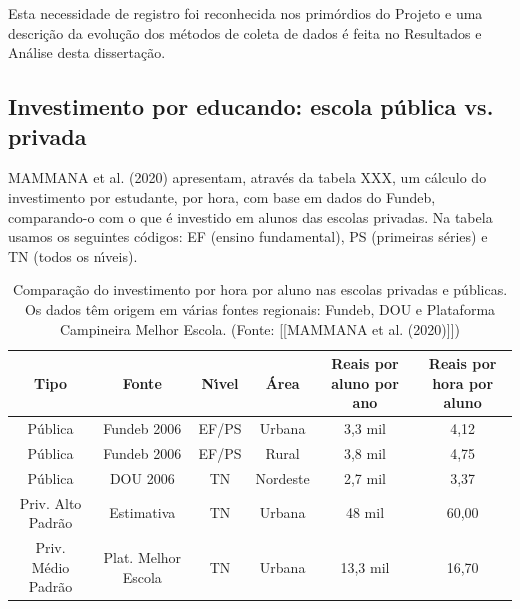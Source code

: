 \documentclass[
12pt,		%
openright,	%
twoside,  %
a4paper,			%
chapter=TITLE,		%
english,			%
french,				%
spanish,			%
brazil				%
]{USPSC-classe/USPSC}
\begin{document}
Esta necessidade de registro foi reconhecida nos prim\'ordios do Projeto e uma descri\c{c}\~ao da evolu\c{c}\~ao dos m\'etodos de coleta de dados \'e feita no Resultados e An\'alise desta disserta\c{c}\~ao.









\subsection[Investimento por educando: escola p\'ublica vs. privada]{Investimento por educando: escola p\'ublica vs. privada}\label{Investimento por educando: escola p\'ublica vs. privada}
MAMMANA et al. (2020)  apresentam, atrav\'es da tabela XXX, um c\'alculo do investimento por estudante, por hora, com base em dados do Fundeb, comparando-o com o que \'e investido em alunos das escolas privadas. Na tabela usamos os seguintes c\'odigos: EF (ensino fundamental), PS (primeiras s\'eries) e TN (todos os n\'{\i}veis).













\begin{table}[htb]
\tiny
\caption{\label{02a61f21bf9049ea550d07c2199237e202a09ecd}Compara\c{c}\~ao do investimento por hora por aluno nas escolas privadas e p\'ublicas. Os dados t\^em origem em v\'arias fontes regionais: Fundeb, DOU e Plataforma Campineira Melhor Escola. (Fonte:  [[MAMMANA et al. (2020)]])}

\centering
\begin{tabular}{|c|c|c|c|c|c|}
\hline
Tipo  &  Fonte  &  N\'{\i}vel  &  \'Area  &  Reais por aluno por ano  &  Reais por hora por aluno \\
\hline
P\'ublica  &  Fundeb 2006  &  EF/PS  &  Urbana  &  3,3 mil  &  4,12 \\
P\'ublica  &  Fundeb 2006  &  EF/PS  &  Rural  &  3,8 mil  &  4,75 \\
P\'ublica  &  DOU 2006  &  TN  &  Nordeste  &  2,7 mil  &  3,37 \\
Priv. Alto Padr\~ao  &  Estimativa  &  TN  &  Urbana  &  48 mil  &  60,00 \\
Priv. M\'edio Padr\~ao  &  Plat. Melhor Escola  &  TN  &  Urbana  &  13,3 mil  &  16,70 \\
\hline
\end{tabular}
\end{table}
\end{document}
